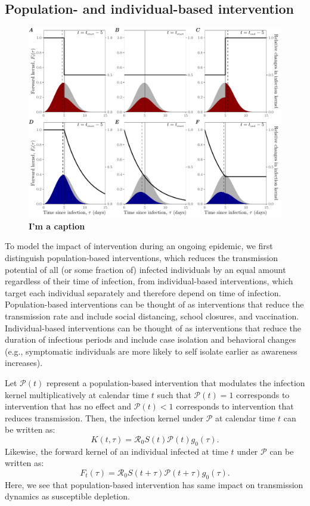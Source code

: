 \documentclass[12pt]{article}
\newcommand{\Rx}[1]{\ensuremath{{\mathcal R}_{#1}}\xspace}
\newcommand{\Ro}{\Rx{0}}
\newcommand{\PP}{{\mathcal P}}
\begin{document}
\subsection{Population- and individual-based intervention}

\begin{figure}[!th]
\includegraphics[width=1\textwidth]{pop_ind_compare.pdf}
\caption{
\textbf{I'm a caption}
}
\label{fig:indpop}
\end{figure}

To model the impact of intervention during an ongoing epidemic, we first distinguish population-based interventions, which reduces the transmission potential of all (or some fraction of) infected individuals by an equal amount regardless of their time of infection, from individual-based interventions, which target each individual separately and therefore depend on time of infection.
Population-based interventions can be thought of as interventions that reduce the transmission rate and include social distancing, school closures, and vaccination.
Individual-based interventions can be thought of as interventions that reduce the duration of infectious periods and include case isolation and behavioral changes (e.g., symptomatic individuals are more likely to self isolate earlier as awareness increases).

Let $\PP(t)$ represent a population-based intervention that modulates the infection kernel multiplicatively at calendar time $t$ such that $\PP(t)=1$ corresponds to intervention that has no effect and $\PP(t) < 1$ corresponds to intervention that reduces transmission.
Then, the infection kernel under $\PP$ at calendar time $t$ can be written as:
\begin{equation}
K(t, \tau) = \Ro S(t) \PP(t) g_0(\tau).
\end{equation}
Likewise, the forward kernel of an individual infected at time $t$ under $\PP$ can be written as:
\begin{equation}
F_t(\tau) =  \Ro S(t+\tau) \PP(t + \tau) g_0(\tau).
\end{equation}
Here, we see that population-based intervention has same impact on transmission dynamics as susceptible depletion.
\end{document}
